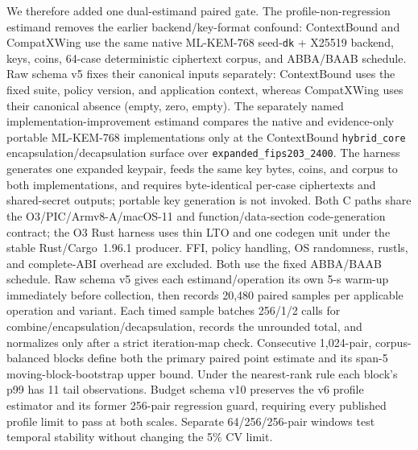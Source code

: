 \documentclass[journal]{IEEEtran}
\newcommand{\code}[1]{\texttt{\small #1}}
\begin{document}
We therefore added one dual-estimand paired gate.  The profile-non-regression
estimand removes the earlier backend/key-format confound: ContextBound and
CompatXWing use the same native ML-KEM-768 seed-\code{dk} + X25519 backend, keys,
coins, 64-case deterministic ciphertext corpus, and ABBA/BAAB schedule. Raw schema
v5 fixes their canonical inputs separately: ContextBound uses the fixed suite,
policy version, and application context, whereas CompatXWing uses their canonical
absence (empty, zero, empty).
The separately named implementation-improvement estimand compares the native and
evidence-only portable ML-KEM-768 implementations only at the ContextBound
\code{hybrid\_core} encapsulation/decapsulation surface over
\code{expanded\_fips203\_2400}.  The harness generates one expanded keypair, feeds
the same key bytes, coins, and corpus to both implementations, and requires
byte-identical per-case ciphertexts and shared-secret outputs; portable key
generation is not invoked. Both C paths share the O3/PIC/Armv8-A/macOS-11 and
function/data-section code-generation contract; the O3 Rust harness uses thin LTO
and one codegen unit under the stable Rust/Cargo~1.96.1 producer. FFI, policy
handling, OS randomness, rustls, and complete-ABI overhead are excluded. Both use
the fixed ABBA/BAAB schedule. Raw schema v5 gives each estimand/operation its own 5-s warm-up
immediately before collection, then records 20,480 paired samples per
applicable operation and variant.  Each timed sample batches 256/1/2 calls for
combine/encapsulation/decapsulation, records the unrounded total, and normalizes
only after a strict iteration-map check. Consecutive 1,024-pair,
corpus-balanced blocks define both the primary paired point estimate and its
span-5 moving-block-bootstrap upper bound. Under the nearest-rank rule each
block's p99 has 11 tail observations. Budget schema v10 preserves the v6 profile
estimator and its former 256-pair regression guard, requiring every published
profile limit to pass at both scales. Separate 64/256/256-pair windows test
temporal stability without changing the 5\% CV limit.
\end{document}
